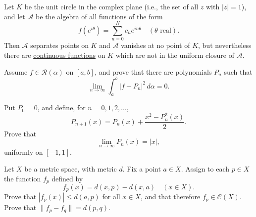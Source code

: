   \begin{exercise}[Rudin 7.21]
    Let $K$ be the unit circle in the complex plane (i.e., the set of all $z$ with $|z| = 1$), and let $\mathscr{A}$ be the algebra of all functions of the form
    \begin{equation}
      f(e^{i\theta}) = \sum_{n=0}^N c_n e^{in\theta} \quad (\theta \text{ real}).
    \end{equation}
    Then $\mathscr{A}$ separates points on $K$ and $\mathscr{A}$ vanishes at no point of $K$, but nevertheless there are \hyperref[pst-def:continuous_func]{continuous functions} on $K$ which are not in the uniform closure of $\mathscr{A}$.
  \end{exercise}
  \begin{solution}

  \end{solution}

  \begin{exercise}[Rudin 7.22]
    Assume $f \in \mathscr{R}(\alpha)$ on $[a, b]$, and prove that there are polynomials $P_n$ such that
    \begin{equation}
      \lim_{n \to \infty} \int_a^b |f - P_n|^2 \, d\alpha = 0.
    \end{equation}
  \end{exercise}
  \begin{solution}

  \end{solution}

  \begin{exercise}[Rudin 7.23]
    Put $P_0 = 0$, and define, for $n = 0, 1, 2, \dots$,
    \begin{equation}
      P_{n+1}(x) = P_n(x) + \frac{x^2 - P_n^2(x)}{2}.
    \end{equation}
    Prove that
    \begin{equation}
      \lim_{n \to \infty} P_n(x) = |x|,
    \end{equation}
    uniformly on $[-1, 1]$.
  \end{exercise}
  \begin{solution}

  \end{solution}

  \begin{exercise}[Rudin 7.24]
    Let $X$ be a metric space, with metric $d$. Fix a point $a \in X$. Assign to each $p \in X$ the function $f_p$ defined by
    \begin{equation}
      f_p(x) = d(x, p) - d(x, a) \quad (x \in X).
    \end{equation}
    Prove that $|f_p(x)| \le d(a, p)$ for all $x \in X$, and that therefore $f_p \in \mathscr{C}(X)$. Prove that $\|f_p - f_q\| = d(p, q)$.
  \end{exercise}
  \begin{solution}

  \end{solution}

